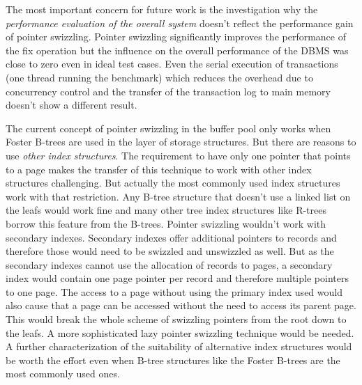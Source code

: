     The most important concern for future work is the investigation why the \emph{performance evaluation of the overall system} doesn't reflect the performance gain of pointer swizzling. Pointer swizzling significantly improves the performance of the fix operation but the influence on the overall performance of the DBMS was close to zero even in ideal test cases. Even the serial execution of transactions (one thread running the benchmark) which reduces the overhead due to concurrency control and the transfer of the transaction log to main memory doesn't show a different result.

    The current concept of pointer swizzling in the buffer pool only works when Foster B-trees are used in the layer of storage structures. But there are reasons to use \emph{other index structures}. The requirement to have only one pointer that points to a page makes the transfer of this technique to work with other index structures challenging. But actually the most commonly used index structures work with that restriction. Any B-tree structure that doesn't use a linked list on the leafs would work fine and many other tree index structures like R-trees borrow this feature from the B-trees. Pointer swizzling wouldn't work with secondary indexes. Secondary indexes offer additional pointers to records and therefore those would need to be swizzled and unswizzled as well. But as the secondary indexes cannot use the allocation of records to pages, a secondary index would contain one page pointer per record and therefore multiple pointers to one page. The access to a page without using the primary index used would also cause that a page can be accessed without the need to access its parent page. This would break the whole scheme of swizzling pointers from the root down to the leafs. A more sophisticated lazy pointer swizzling technique would be needed. A further characterization of the suitability of alternative index structures would be worth the effort even when B-tree structures like the Foster B-trees are the most commonly used ones.

